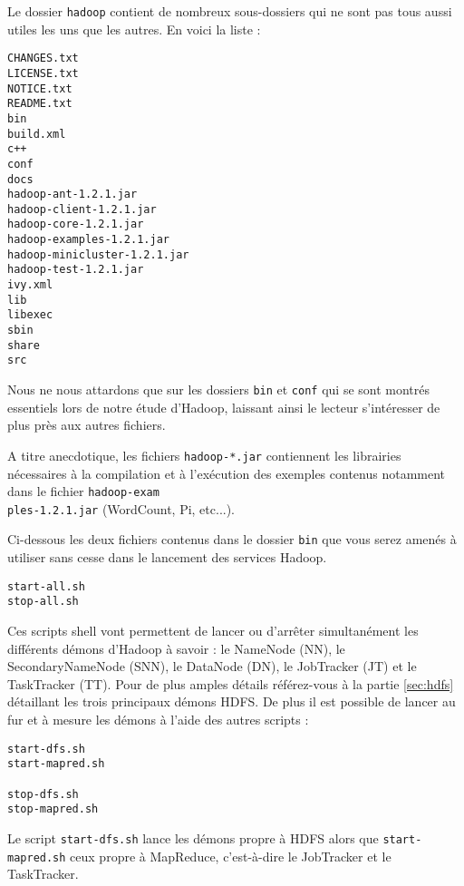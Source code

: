 \par Le dossier \texttt{hadoop} contient de nombreux sous-dossiers qui ne sont pas tous aussi utiles les uns que les autres. En voici la liste :

\begin{verbatim}
CHANGES.txt
LICENSE.txt
NOTICE.txt
README.txt
bin
build.xml
c++
conf
docs
hadoop-ant-1.2.1.jar
hadoop-client-1.2.1.jar
hadoop-core-1.2.1.jar
hadoop-examples-1.2.1.jar
hadoop-minicluster-1.2.1.jar
hadoop-test-1.2.1.jar
ivy.xml
lib
libexec
sbin
share
src
\end{verbatim}

\par Nous ne nous attardons que sur les dossiers \texttt{bin} et \texttt{conf} qui se sont montrés essentiels lors de notre étude d'Hadoop, laissant ainsi le lecteur s'intéresser de plus près aux autres fichiers.

\par A titre anecdotique, les fichiers \texttt{hadoop-*.jar} contiennent les librairies nécessaires à la compilation et à l'exécution des exemples contenus notamment dans le fichier \texttt{hadoop-exam\\ples-1.2.1.jar} (WordCount, Pi, etc...).

\par Ci-dessous les deux fichiers contenus dans le dossier \texttt{bin} que vous serez amenés à utiliser sans cesse dans le lancement des services Hadoop.

\begin{verbatim}
start-all.sh
stop-all.sh			
\end{verbatim}

\par Ces scripts shell vont permettent de lancer ou d'arrêter simultanément les différents démons d'Hadoop à savoir : le NameNode (NN), le SecondaryNameNode (SNN), le DataNode (DN), le JobTracker (JT) et le TaskTracker (TT). Pour de plus amples détails référez-vous à la partie \ref{sec:hdfs} détaillant les trois principaux démons HDFS. De plus il est possible de lancer au fur et à mesure les démons à l'aide des autres scripts :

\begin{verbatim}
start-dfs.sh
start-mapred.sh

stop-dfs.sh
stop-mapred.sh
\end{verbatim}

\par Le script \texttt{start-dfs.sh} lance les démons propre à HDFS alors que \texttt{start-mapred.sh} ceux propre à MapReduce, c'est-à-dire le JobTracker et le TaskTracker.

